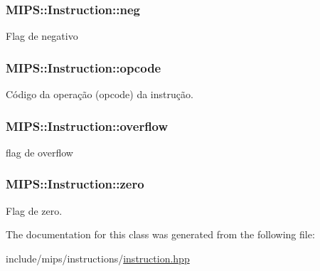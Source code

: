 \subsubsection[{\texorpdfstring{neg}{neg}}]{ M\+I\+P\+S\+::\+Instruction\+::neg\hspace{0.3cm}{\ttfamily [protected]}}\hypertarget{classMIPS_1_1Instruction_ad13e93d52d4df49287f3e92711b3927f}{}\label{classMIPS_1_1Instruction_ad13e93d52d4df49287f3e92711b3927f}
Flag de negativo 
\subsubsection[{\texorpdfstring{opcode}{opcode}}]{ M\+I\+P\+S\+::\+Instruction\+::opcode\hspace{0.3cm}{\ttfamily [protected]}}\hypertarget{classMIPS_1_1Instruction_a45cc6808b5dde8a5d41067d148b55476}{}\label{classMIPS_1_1Instruction_a45cc6808b5dde8a5d41067d148b55476}
Código da operação (opcode) da instrução. 
\subsubsection[{\texorpdfstring{overflow}{overflow}}]{ M\+I\+P\+S\+::\+Instruction\+::overflow\hspace{0.3cm}{\ttfamily [protected]}}\hypertarget{classMIPS_1_1Instruction_a34c04dbd0f64117d7b19f8bf6e6cb87a}{}\label{classMIPS_1_1Instruction_a34c04dbd0f64117d7b19f8bf6e6cb87a}
flag de overflow 
\subsubsection[{\texorpdfstring{zero}{zero}}]{ M\+I\+P\+S\+::\+Instruction\+::zero\hspace{0.3cm}{\ttfamily [protected]}}\hypertarget{classMIPS_1_1Instruction_a78e2b55f80640b476e99ee54f5be068c}{}\label{classMIPS_1_1Instruction_a78e2b55f80640b476e99ee54f5be068c}
Flag de zero. 

The documentation for this class was generated from the following file\+:\begin{DoxyCompactItemize}
\item 
include/mips/instructions/\hyperlink{instruction_8hpp}{instruction.\+hpp}\end{DoxyCompactItemize}
